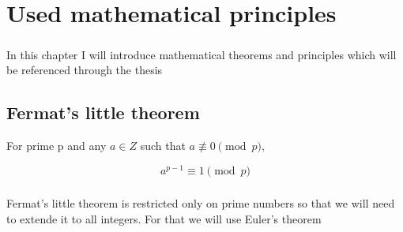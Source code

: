 \documentclass[thesis=B,english]{FITthesis}[2012/10/20]
\begin{document}
{\paragraph*{}{
}
\paragraph*{}{
}

\chapter{Used mathematical principles}
\paragraph*{}{
In this chapter I will introduce mathematical theorems and principles which will be referenced through the thesis
}

\section{Fermat's little theorem}
{
For prime p and any \(a \in Z\) such that \(a \not\equiv 0 \pmod p,\)}

\[a^{p-1} \equiv 1 \pmod p\]
}
\paragraph*{}
{Fermat's little theorem is restricted only on prime numbers so that we will need to extende it to all integers. For that we will use Euler's theorem}
% 
\end{document}
